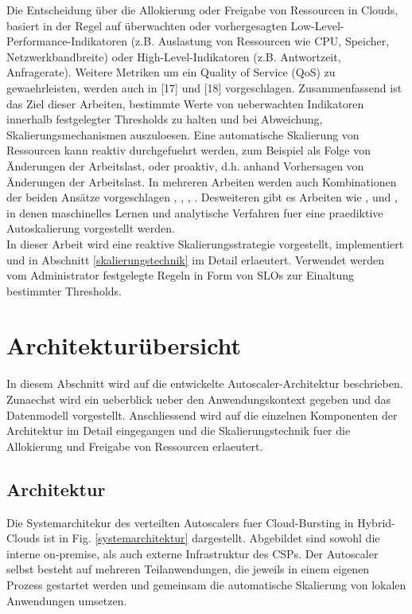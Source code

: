 \documentclass[runningheads]{llncs}
\begin{document}
Die Entscheidung über die Allokierung oder Freigabe von Ressourcen in Clouds, basiert in der Regel auf überwachten oder vorhergesagten Low-Level-Performance-Indikatoren (z.B. Auslastung von Ressourcen wie CPU, Speicher, Netzwerkbandbreite) oder High-Level-Indikatoren (z.B. Antwortzeit, Anfragerate). Weitere Metriken um ein Quality of Service (QoS) zu gewaehrleisten, werden auch in [17] und [18] vorgeschlagen. Zusammenfassend ist das Ziel dieser Arbeiten, bestimmte Werte von ueberwachten Indikatoren innerhalb  festgelegter Thresholds zu halten und bei Abweichung, Skalierungsmechanismen auszuloesen. Eine automatische Skalierung von Ressourcen kann reaktiv durchgefuehrt werden, zum Beispiel als Folge von Änderungen der Arbeitslast, oder proaktiv, d.h. anhand Vorhersagen von Änderungen der Arbeitslast. In mehreren Arbeiten werden auch Kombinationen der beiden Ansätze vorgeschlagen \cite{ali-eldin_adaptive_2012}, \cite{gandhi_adaptive_nodate}, \cite{fernandez_autoscaling_2014}, \cite{bouabdallah_use_2016}. Desweiteren gibt es Arbeiten wie \cite{moreno-vozmediano_efficient_2019}, \cite{iqbal_unsupervised_2016} und \cite{bu_reinforcement_2009}, in denen maschinelles Lernen und analytische Verfahren fuer eine praediktive Autoskalierung vorgestellt werden. \\

In dieser Arbeit wird eine reaktive Skalierungsstrategie vorgestellt, implementiert und in Abschnitt \ref{skalierungstechnik} im Detail erlaeutert. Verwendet werden vom Administrator festgelegte Regeln in Form von SLOs zur Einaltung bestimmter Thresholds.  \\
	
\section{Architekturübersicht} \label{Architekturübersicht}
	
In diesem Abschnitt wird auf die entwickelte Autoscaler-Architektur beschrieben. Zunaechst wird ein ueberblick ueber den Anwendungskontext gegeben und das Datenmodell vorgestellt. Anschliessend wird auf die einzelnen Komponenten der Architektur im Detail eingegangen und die Skalierungstechnik fuer die Allokierung und Freigabe von Ressourcen erlaeutert.
	
\subsection{Architektur}

Die Systemarchitekur des verteilten Autoscalers fuer Cloud-Bursting in Hybrid-Clouds ist in Fig. \ref{systemarchitektur} dargestellt. Abgebildet sind sowohl die interne on-premise, als auch externe Infrastruktur des CSPs. Der Autoscaler selbst besteht auf mehreren Teilanwendungen, die jeweils in einem eigenen Prozess gestartet werden und gemeinsam die automatische Skalierung von lokalen Anwendungen umsetzen.
	
\end{document}
